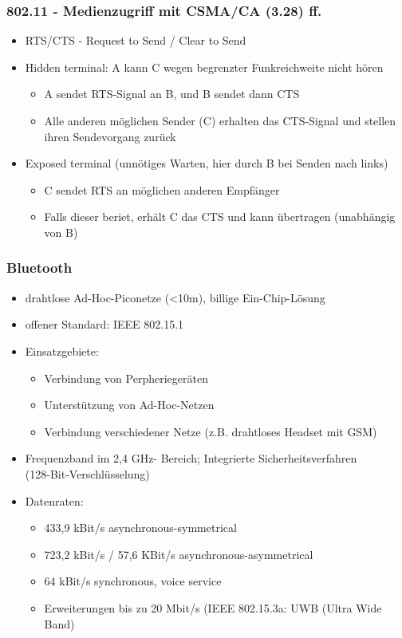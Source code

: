 \subsubsection{802.11 - Medienzugriff mit CSMA/CA (3.28) ff.}
\begin{itemize}
	\item RTS/CTS - Request to Send / Clear to Send
	\item Hidden terminal: A kann C wegen begrenzter Funkreichweite nicht hören
	\begin{itemize}
		\item A sendet RTS-Signal an B, und B sendet dann CTS
		\item Alle anderen möglichen Sender (C) erhalten das CTS-Signal und stellen ihren Sendevorgang zurück
	\end{itemize}
	\item Exposed terminal (unnötiges Warten, hier durch B bei Senden nach links)
	\begin{itemize}
		\item C sendet RTS an möglichen anderen Empfänger
		\item Falls dieser beriet, erhält C das CTS und kann übertragen (unabhängig von B)
	\end{itemize}
\end{itemize}
\subsubsection{Bluetooth}
\begin{itemize}
		\item drahtlose Ad-Hoc-Piconetze (<10m), billige Ein-Chip-Lösung
		\item offener Standard: IEEE 802.15.1
		\item Einsatzgebiete:
		\begin{itemize}
			\item Verbindung von Perpheriegeräten
			\item Unterstützung von Ad-Hoc-Netzen
			\item Verbindung verschiedener Netze (z.B. drahtloses Headset mit GSM)
		\end{itemize}
		\item Frequenzband im 2,4 GHz- Bereich; Integrierte Sicherheitsverfahren \\(128-Bit-Verschlüsselung)
		\item Datenraten:
		\begin{itemize}
			\item 433,9 kBit/s asynchronous-symmetrical
			\item 723,2 kBit/s / 57,6 KBit/s asynchronous-asymmetrical
			\item 64 kBit/s synchronous, voice service
			\item Erweiterungen bis zu 20 Mbit/s (IEEE 802.15.3a: UWB (Ultra Wide Band)
		\end{itemize}
\end{itemize}
